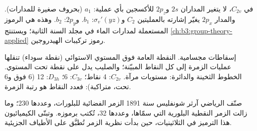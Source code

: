 \begin{example}\label{ex:b3:point-groups:water-orbitals}
في $C_{2v}$، لا يتغير المداران $2s$ و$2p_z$ للأكسجين بأي
عملية: $a_1$ (بحروف صغيرة للمدارات). والمدار $2p_x$ يغيّر إشارته بالعمليتين $C_2$ 
و$\sigma_v'(yz)$: $b_1$. و$2p_y$: $b_2$. وهذه هي الرموز المستعملة لمدارات
الماء في مجلد السنة الثانية؛ ويستنتج \cref{ch:b3:group-theory-applied}
رموز تركيبات الهيدروجين.
\end{example}

\begin{omfigure}

{\small إسقاطات مجسامية. النقطة العامة فوق المستوي الاستوائي
(نقطة سوداء) تنقلها عمليات الزمرة إلى كل النقاط
المبيّنة؛ والصليب يدل على نقطة تحت المستوي. الخطوط الثخينة والدائرة:
مستويات مرآة. $C_{2v}$: 4 نقاط؛ $C_{3v}$: 6؛ $D_{3h}$: 12 (6 فوق و6
تحت، متراكبة): فعدد النقاط هو رتبة الزمرة.}
\end{omfigure}

\begin{history}
صنّف الرياضي آرثر شونفليس سنة 1891 الزمر الفضائية
للبلورات، وعددها 230؛ وما زالت الزمر النقطية البلورية التي سمّاها، وعددها 32،
تُكتب برموزه. وتبنّى الكيميائيون هذا الترميز في الثلاثينيات،
حين بدأت نظرية الزمر تُطبَّق على الأطياف الجزيئية.
\end{history}

